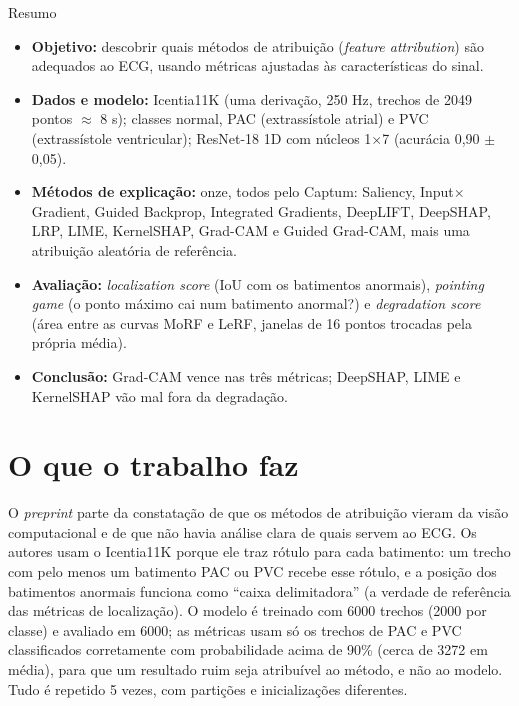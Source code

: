 \documentclass[11pt,a4paper]{article}
\begin{document}
\begin{infobox}[note]{Resumo}
\begin{itemize}
  \item \textbf{Objetivo:} descobrir quais métodos de atribuição (\textit{feature attribution}) são adequados ao ECG, usando métricas ajustadas às características do sinal.
  \item \textbf{Dados e modelo:} Icentia11K (uma derivação, 250 Hz, trechos de 2049 pontos $\approx$ 8 s); classes normal, PAC (extrassístole atrial) e PVC (extrassístole ventricular); ResNet-18 1D com núcleos 1$\times$7 (acurácia 0,90 $\pm$ 0,05).
  \item \textbf{Métodos de explicação:} onze, todos pelo Captum: Saliency, Input$\times$Gradient, Guided Backprop, Integrated Gradients, DeepLIFT, DeepSHAP, LRP, LIME, KernelSHAP, Grad-CAM e Guided Grad-CAM, mais uma atribuição aleatória de referência.
  \item \textbf{Avaliação:} \textit{localization score} (IoU com os batimentos anormais), \textit{pointing game} (o ponto máximo cai num batimento anormal?) e \textit{degradation score} (área entre as curvas MoRF e LeRF, janelas de 16 pontos trocadas pela própria média).
  \item \textbf{Conclusão:} Grad-CAM vence nas três métricas; DeepSHAP, LIME e KernelSHAP vão mal fora da degradação.
\end{itemize}
\end{infobox}

\section{O que o trabalho faz}
O \textit{preprint} parte da constatação de que os métodos de atribuição vieram da visão computacional e de que não havia análise clara de quais servem ao ECG. Os autores usam o Icentia11K porque ele traz rótulo para cada batimento: um trecho com pelo menos um batimento PAC ou PVC recebe esse rótulo, e a posição dos batimentos anormais funciona como “caixa delimitadora” (a verdade de referência das métricas de localização). O modelo é treinado com 6000 trechos (2000 por classe) e avaliado em 6000; as métricas usam só os trechos de PAC e PVC classificados corretamente com probabilidade acima de 90\% (cerca de 3272 em média), para que um resultado ruim seja atribuível ao método, e não ao modelo. Tudo é repetido 5 vezes, com partições e inicializações diferentes.
\end{document}
